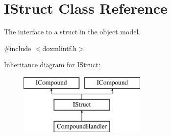 \hypertarget{class_i_struct}{}\section{I\+Struct Class Reference}
\label{class_i_struct}


The interface to a struct in the object model.  




{\ttfamily \#include $<$doxmlintf.\+h$>$}

Inheritance diagram for I\+Struct\+:\begin{figure}[H]
\begin{center}
\leavevmode
\includegraphics[height=3.000000cm]{class_i_struct}
\end{center}
\end{figure}
